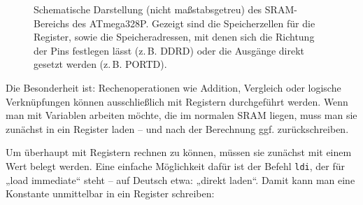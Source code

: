 \documentclass[a4paper,12pt]{article}
\begin{document}
\begin{figure}[htbp]
\begin{center}
{
} %
\end{center}
\caption{
    Schematische Darstellung (nicht maßstabsgetreu) des SRAM-Bereichs des
    ATmega328P. Gezeigt sind die Speicherzellen für die Register, sowie die
    Speicheradressen, mit denen sich die Richtung der Pins festlegen lässt
    (z.\,B. DDRD) oder die Ausgänge direkt gesetzt werden (z.\,B. PORTD).
}
\label{fig:sram-struktur}
\end{figure}

Die Besonderheit ist: Rechenoperationen wie Addition, Vergleich oder logische
Verknüpfungen können ausschließlich mit Registern durchgeführt werden.  Wenn
man mit Variablen arbeiten möchte, die im normalen SRAM liegen, muss man sie
zunächst in ein Register laden – und nach der Berechnung ggf. zurückschreiben.

\noindent
Um überhaupt mit Registern rechnen zu können, müssen sie zunächst mit einem Wert
belegt werden. Eine einfache Möglichkeit dafür ist der Befehl \texttt{ldi}, der
für „load immediate“ steht – auf Deutsch etwa: „direkt laden“. Damit kann man
eine Konstante unmittelbar in ein Register schreiben:
\end{document}
